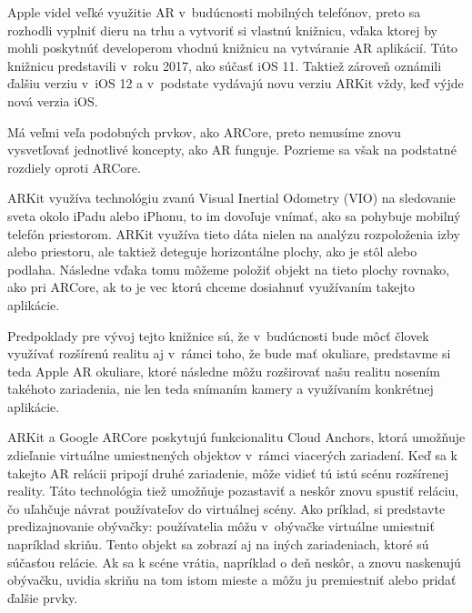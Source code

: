 Apple videl veľké využitie AR v~budúcnosti mobilných telefónov, preto sa rozhodli vyplniť dieru na trhu a vytvoriť si vlastnú knižnicu, vďaka ktorej by mohli poskytnúť developerom vhodnú knižnicu na vytváranie AR aplikácií. Túto knižnicu predstavili v~roku 2017, ako súčasť iOS 11. Taktiež zároveň oznámili ďalšiu verziu v~iOS 12 a v~podstate vydávajú novu verziu ARKit vždy, keď výjde nová verzia iOS. 

Má veľmi veľa podobných prvkov, ako ARCore, preto nemusíme znovu vysvetľovať jednotlivé koncepty, ako AR funguje. Pozrieme sa však na podstatné rozdiely oproti ARCore.

ARKit využíva technológiu zvanú Visual Inertial Odometry (VIO) na sledovanie sveta okolo iPadu alebo iPhonu, to im dovoľuje vnímať, ako sa pohybuje mobilný telefón priestorom. ARKit využíva tieto dáta nielen na analýzu rozpoloženia izby alebo priestoru, ale taktiež deteguje horizontálne plochy, ako je stôl alebo podlaha. Následne vďaka tomu môžeme položiť objekt na tieto plochy rovnako, ako pri ARCore, ak to je vec ktorú chceme dosiahnuť využívaním takejto aplikácie.

Predpoklady pre vývoj tejto knižnice sú, že v~budúcnosti bude môcť človek využívať rozšírenú realitu aj v~rámci toho, že bude mať okuliare, predstavme si teda Apple AR okuliare, ktoré následne môžu rozširovať našu realitu nosením takéhoto zariadenia, nie len teda snímaním kamery a využívaním konkrétnej aplikácie.

ARKit a Google ARCore poskytujú funkcionalitu Cloud Anchors, ktorá umožňuje zdieľanie virtuálne umiestnených objektov v~rámci viacerých zariadení. Keď sa k takejto AR relácii pripojí druhé zariadenie, môže vidieť tú istú scénu rozšírenej reality. Táto technológia tiež umožňuje pozastaviť a neskôr znovu spustiť reláciu, čo uľahčuje návrat používateľov do virtuálnej scény. Ako príklad, si predstavte predizajnovanie obývačky: používatelia môžu v~obývačke virtuálne umiestniť napríklad skriňu. Tento objekt sa zobrazí aj na iných zariadeniach, ktoré sú súčasťou relácie. Ak sa k scéne vrátia, napríklad o deň neskôr, a znovu naskenujú obývačku, uvidia skriňu na tom istom mieste a môžu ju premiestniť alebo pridať ďalšie prvky. %

